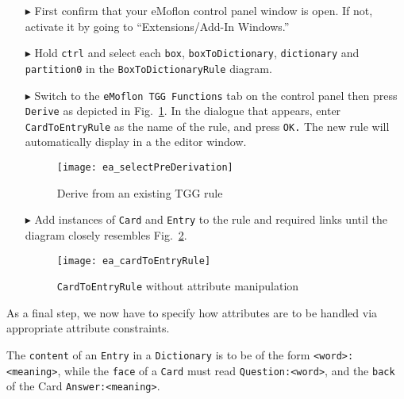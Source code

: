 \begin{enumerate}
  
\item[$\blacktriangleright$] First confirm that your eMoflon control panel window is open. If not, activate it by going to ``Extensions/Add-In Windows.''
  
\item[$\blacktriangleright$] Hold \texttt{ctrl} and select each \texttt{box}, \texttt{boxToDictionary}, \texttt{dictionary} and
\texttt{partition0} in the \texttt{Box\-To\-Dictionary\-Rule} diagram.
  
\item[$\blacktriangleright$] Switch to the \texttt{eMoflon TGG Functions} tab on the control panel then press \texttt{Derive} as depicted in
Fig.~\ref{fig:derive_from_tgg_rule}. In the dialogue that appears, enter \texttt{CardToEntryRule} as the name of the rule, and press \texttt{OK.} The new rule
will automatically display in a the editor window.

\begin{figure}[htbp]
\begin{center}
 \texttt{[image: ea\_selectPreDerivation]}
  \caption{Derive from an existing TGG rule}
  \label{fig:derive_from_tgg_rule}
\end{center}
\end{figure}
\FloatBarrier

\item[$\blacktriangleright$] Add instances of \texttt{Card} and \texttt{Entry} to the rule and required links until the diagram closely resembles
Fig.~\ref{fig:cardtoentry_1}.

  \begin{figure}[htbp]
  \begin{center}
    \texttt{[image: ea\_cardToEntryRule]}
    \caption{\texttt{CardToEntryRule} without attribute manipulation}
    \label{fig:cardtoentry_1}
  \end{center}
  \end{figure}

\end{enumerate}

As a final step, we now have to specify how attributes are to be handled via appropriate attribute constraints.

The \texttt{content} of an \texttt{Entry} in a \texttt{Dictionary} is to be of the form \texttt{<word>:<meaning>}, while the \texttt{face} of a \texttt{Card}
must read \texttt{Question:<word>}, and the \texttt{back} of the Card \texttt{Answer:<meaning>}.

